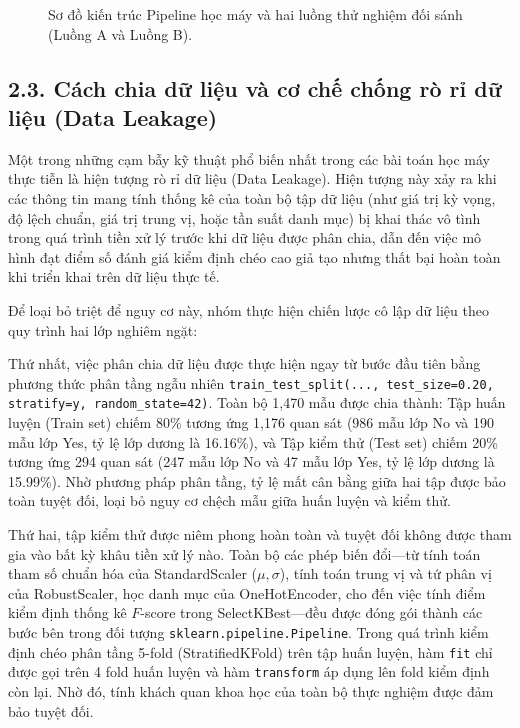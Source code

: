 \documentclass[12pt,a4paper]{article}
\begin{document}
\begin{figure}[H]
\caption{Sơ đồ kiến trúc Pipeline học máy và hai luồng thử nghiệm đối sánh (Luồng A và Luồng B).}
\label{fig:pipeline_diagram}
\end{figure}

\subsection{2.3. Cách chia dữ liệu và cơ chế chống rò rỉ dữ liệu (Data Leakage)}
Một trong những cạm bẫy kỹ thuật phổ biến nhất trong các bài toán học máy thực tiễn là hiện tượng rò rỉ dữ liệu (Data Leakage). Hiện tượng này xảy ra khi các thông tin mang tính thống kê của toàn bộ tập dữ liệu (như giá trị kỳ vọng, độ lệch chuẩn, giá trị trung vị, hoặc tần suất danh mục) bị khai thác vô tình trong quá trình tiền xử lý trước khi dữ liệu được phân chia, dẫn đến việc mô hình đạt điểm số đánh giá kiểm định chéo cao giả tạo nhưng thất bại hoàn toàn khi triển khai trên dữ liệu thực tế.

Để loại bỏ triệt để nguy cơ này, nhóm thực hiện chiến lược cô lập dữ liệu theo quy trình hai lớp nghiêm ngặt:

Thứ nhất, việc phân chia dữ liệu được thực hiện ngay từ bước đầu tiên bằng phương thức phân tầng ngẫu nhiên \texttt{train\_test\_split(..., test\_size=0.20, stratify=y, random\_state=42)}. Toàn bộ 1,470 mẫu được chia thành: Tập huấn luyện (Train set) chiếm 80\% tương ứng 1,176 quan sát (986 mẫu lớp No và 190 mẫu lớp Yes, tỷ lệ lớp dương là 16.16\%), và Tập kiểm thử (Test set) chiếm 20\% tương ứng 294 quan sát (247 mẫu lớp No và 47 mẫu lớp Yes, tỷ lệ lớp dương là 15.99\%). Nhờ phương pháp phân tầng, tỷ lệ mất cân bằng giữa hai tập được bảo toàn tuyệt đối, loại bỏ nguy cơ chệch mẫu giữa huấn luyện và kiểm thử.

Thứ hai, tập kiểm thử được niêm phong hoàn toàn và tuyệt đối không được tham gia vào bất kỳ khâu tiền xử lý nào. Toàn bộ các phép biến đổi—từ tính toán tham số chuẩn hóa của StandardScaler ($\mu, \sigma$), tính toán trung vị và tứ phân vị của RobustScaler, học danh mục của OneHotEncoder, cho đến việc tính điểm kiểm định thống kê $F$-score trong SelectKBest—đều được đóng gói thành các bước bên trong đối tượng \texttt{sklearn.pipeline.Pipeline}. Trong quá trình kiểm định chéo phân tầng 5-fold (StratifiedKFold) trên tập huấn luyện, hàm \texttt{fit} chỉ được gọi trên 4 fold huấn luyện và hàm \texttt{transform} áp dụng lên fold kiểm định còn lại. Nhờ đó, tính khách quan khoa học của toàn bộ thực nghiệm được đảm bảo tuyệt đối.
\end{document}
